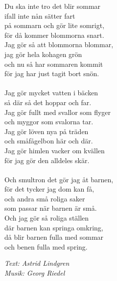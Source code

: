 \vspace{10pt}
Du ska inte tro det blir sommar\\
ifall inte nån sätter fart\\
på sommarn och gör lite somrigt,\\
för då kommer blommorna snart.\\
Jag gör så att blommorna blommar,\\
jag gör hela kohagen grön\\
och nu så har sommaren kommit\\
för jag har just tagit bort snön.\\
\\
Jag gör mycket vatten i bäcken\\
så där så det hoppar och far.\\
Jag gör fullt med svallor som flyger\\
och myggor som svalorna tar.\\
Jag gör löven nya på träden\\
och småfågelbon här och där.\\
Jag gör himlen vacker om kvällen\\
för jag gör den alldeles skär.\\
\\
Och smultron det gör jag åt barnen,\\
för det tycker jag dom kan få,\\
och andra små roliga saker\\
som passar när barnen är små.\\
Och jag gör så roliga ställen\\
där barnen kan springa omkring,\\
då blir barnen fulla med sommar\\
och benen fulla med spring.
\par
\vspace{10pt}
{\footnotesize\textit{Text: Astrid Lindgren\\ Musik: Georg Riedel}}

